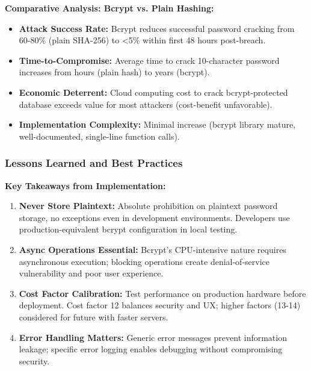 \documentclass[12pt,a4paper]{article}
\begin{document}
\begin{tcolorbox}[colback=primaryblue!5, colframe=primaryblue, boxrule=1pt, arc=3pt, left=10pt, right=10pt, top=8pt, bottom=8pt]
\vspace{0.5em}

\textbf{Comparative Analysis: Bcrypt vs. Plain Hashing:}

\begin{itemize}[leftmargin=2em, itemsep=6pt]
    \item \textbf{Attack Success Rate:} Bcrypt reduces successful password cracking from 60-80\% (plain SHA-256) to <5\% within first 48 hours post-breach.
    \item \textbf{Time-to-Compromise:} Average time to crack 10-character password increases from hours (plain hash) to years (bcrypt).
    \item \textbf{Economic Deterrent:} Cloud computing cost to crack bcrypt-protected database exceeds value for most attackers (cost-benefit unfavorable).
    \item \textbf{Implementation Complexity:} Minimal increase (bcrypt library mature, well-documented, single-line function calls).
\end{itemize}

\subsubsection{Lessons Learned and Best Practices}

\textbf{Key Takeaways from Implementation:}

\begin{enumerate}[leftmargin=2em, itemsep=6pt]
    \item \textbf{Never Store Plaintext:} Absolute prohibition on plaintext password storage, no exceptions even in development environments. Developers use production-equivalent bcrypt configuration in local testing.
    
    \item \textbf{Async Operations Essential:} Bcrypt's CPU-intensive nature requires asynchronous execution; blocking operations create denial-of-service vulnerability and poor user experience.
    
    \item \textbf{Cost Factor Calibration:} Test performance on production hardware before deployment. Cost factor 12 balances security and UX; higher factors (13-14) considered for future with faster servers.
    
    \item \textbf{Error Handling Matters:} Generic error messages prevent information leakage; specific error logging enables debugging without compromising security.
    

\end{enumerate}
\end{tcolorbox}
\end{document}
